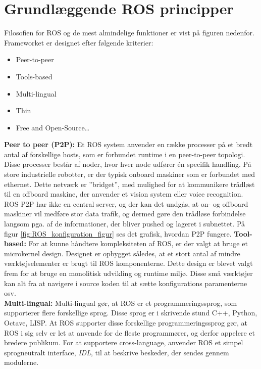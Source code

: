 \section{Grundlæggende ROS principper}
Filosofien for ROS og de mest almindelige funktioner er vist på figuren nedenfor.
Frameworket er designet efter følgende kriterier:
\begin{itemize}  
\item Peer-to-peer
\item Tools-based 
\item Multi-lingual
\item Thin
\item Free and Open-Source\ldots 
\end{itemize}
\textbf{Peer to peer (P2P):}
Et ROS system anvender en række processer på et bredt antal af forskellige hosts, som er forbundet runtime i en peer-to-peer topologi.
Disse processer består af noder, hvor hver node udfører én specifik handling. På store industrielle robotter, er der typisk onboard maskiner som er forbundet med ethernet.
Dette netværk er ''bridget'', med mulighed for at kommunikere trådløst til en offboard maskine, der anvender et vision system eller voice recognition.
ROS P2P har ikke en central server, og der kan det undgås, at on- og offboard maskiner vil medføre stor data trafik, og dermed gøre den trådløse forbindelse langsom pga. af de informationer, der bliver pushed og lageret i subnettet.
På figur \ref{fig:ROS_konfiguration_figur} ses det grafisk, hvordan P2P fungere. 
\textbf{Tool-based:} For at kunne håndtere kompleksiteten af ROS, er der valgt at bruge et microkernel design.
Designet er opbygget således, at et stort antal af mindre værktøjselementer er brugt til ROS komponenterne.
Dette design er blevet valgt frem for at bruge en monolitisk udvikling og runtime miljø.
Disse små værktøjer kan alt fra at navigere i source koden til at sætte konfigurations paramenterne osv.\\
\newline
\textbf{Multi-lingual:} Multi-lingual gør, at ROS er et programmeringssprog, som supporterer flere forskellige sprog.
Disse sprog er i skrivende stund C++, Python, Octave, LISP.
At ROS supporter disse forskellige programmeringssprog gør, at ROS i sig selv er let at anvende for de fleste programmører, og derfor appelere et bredere publikum.
For at supportere cross-language, anvender ROS et simpel sprogneutralt interface, \textit{IDL}, til at beskrive beskeder, der sendes gennem modulerne.
